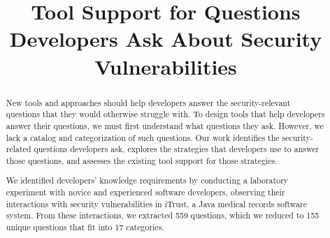 \documentclass[conference]{IEEEtran}
\begin{document}
%

\title{Tool Support for Questions Developers Ask About Security Vulnerabilities}


\author{
\and
{}
}



\maketitle

\begin{abstract}

New tools and approaches should help developers answer the security-relevant questions that they would otherwise struggle with. 
To design tools that help developers answer their questions, we must first understand what questions they ask.
However, we lack a catalog and categorization of such questions. 
Our work identifies the security-related questions developers ask, explores the strategies that developers use to answer those questions, and assesses the existing tool support for those strategies.  

We identified developers' knowledge requirements by conducting a laboratory experiment with novice and experienced software developers, observing their interactions with security vulnerabilities in iTrust, a Java medical records software system.
From these interactions, we extracted 559 questions, which we reduced to 155 unique questions that fit into 17 categories.


\end{abstract}
\end{document}
